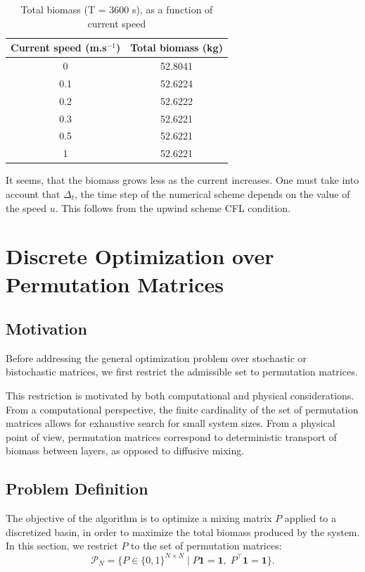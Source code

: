 \documentclass{article}
\begin{document}
\begin{table}[h!]
\centering
\begin{tabular}{|c|c|}
\hline
\textbf{Current speed (m.s$^{-1}$)} & \textbf{Total biomass (kg)} \\
\hline
0   & 52.8041 \\
0.1 & 52.6224 \\
0.2 & 52.6222 \\
0.3 & 52.6221 \\
0.5 & 52.6221 \\
1   & 52.6221 \\

\hline
\end{tabular}
\caption{Total biomass (T = 3600 s), as a function of current speed}
\label{tab:biomass_speed}
\end{table}

It seems, that the biomass grows less as the current increases. One must take into account that $\Delta_t$, the time step of the numerical scheme depends on the value of the speed $u$. 
This follows from the upwind scheme CFL condition. 


\section{Discrete Optimization over Permutation Matrices}

\subsection{Motivation}
Before addressing the general optimization problem over stochastic or bistochastic matrices, 
we first restrict the admissible set to permutation matrices.

This restriction is motivated by both computational and physical considerations.
From a computational perspective, the finite cardinality of the set of permutation matrices 
allows for exhaustive search for small system sizes. 
From a physical point of view, permutation matrices correspond to deterministic transport 
of biomass between layers, as opposed to diffusive mixing. 

\subsection{Problem Definition}

The objective of the algorithm is to optimize a mixing matrix $P$ applied to a discretized basin,
in order to maximize the total biomass produced by the system. In this section, we restrict $P$ to the set of permutation matrices:
\[
\mathcal{P}_N = \{ P \in \{0,1\}^{N \times N} \mid P \mathbf{1} = \mathbf{1}, \; P^\top \mathbf{1} = \mathbf{1} \}.
\]
\end{document}
